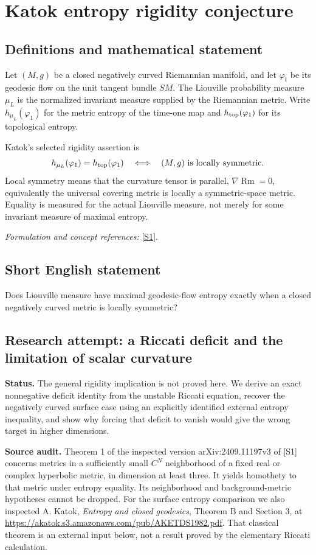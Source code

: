 \documentclass[11pt]{article}
\begin{document}
\section*{\texorpdfstring{Katok entropy rigidity conjecture}{Katok entropy rigidity conjecture}}\label{459}
\subsection{Definitions and mathematical statement}
Let $(M,g)$ be a closed negatively curved Riemannian manifold, and let $\varphi_t$ be its geodesic flow on the unit tangent bundle $SM$. The Liouville probability measure $\mu_L$ is the normalized invariant measure supplied by the Riemannian metric. Write $h_{\mu_L}(\varphi_1)$ for the metric entropy of the time-one map and $h_{\rm top}(\varphi_1)$ for its topological entropy.

Katok's selected rigidity assertion is
\[
 h_{\mu_L}(\varphi_1)=h_{\rm top}(\varphi_1)
 \quad\Longleftrightarrow\quad (M,g)\text{ is locally symmetric}.
\]
Local symmetry means that the curvature tensor is parallel, $\nabla\operatorname{Rm}=0$, equivalently the universal covering metric is locally a symmetric-space metric. Equality is measured for the actual Liouville measure, not merely for some invariant measure of maximal entropy.
\par\smallskip\textit{Formulation and concept references:} \href{https://arxiv.org/abs/2409.11197}{[S1]}.

\subsection{Short English statement}
Does Liouville measure have maximal geodesic-flow entropy exactly when a closed negatively curved metric is locally symmetric?
\subsection{Research attempt: a Riccati deficit and the limitation of scalar curvature}
\textbf{Status.} The general rigidity implication is not proved here. We derive an exact nonnegative deficit identity from the unstable Riccati equation, recover the negatively curved surface case using an explicitly identified external entropy inequality, and show why forcing that deficit to vanish would give the wrong target in higher dimensions.

\textbf{Source audit.} Theorem 1 of the inspected version arXiv:2409.11197v3 of [S1] concerns metrics in a sufficiently small $C^N$ neighborhood of a fixed real or complex hyperbolic metric, in dimension at least three. It yields homothety to that metric under entropy equality. Its neighborhood and background-metric hypotheses cannot be dropped. For the surface entropy comparison we also inspected A. Katok, \emph{Entropy and closed geodesics}, Theorem B and Section 3, at \url{https://akatok.s3.amazonaws.com/pub/AKETDS1982.pdf}. That classical theorem is an external input below, not a result proved by the elementary Riccati calculation.
\end{document}
